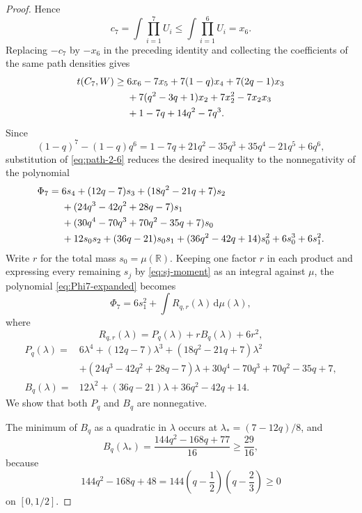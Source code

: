 \documentclass[11pt]{article}
\numberwithin{equation}{section}
\newcommand{\R}{\mathbb R}
\newcommand{\dd}{\,\mathrm d}
\begin{document}
\begin{proof}
  Hence
  \[
    c_7=\int\prod_{i=1}^7U_i
    \le\int\prod_{i=1}^6U_i=x_6.
  \]
  Replacing $-c_7$ by $-x_6$ in the preceding identity and collecting the coefficients of the same path densities gives
  \begin{align}
    t(C_7,W)\ge{}&6x_6-7x_5+7(1-q)x_4+7(2q-1)x_3 \notag\\
    &+7(q^2-3q+1)x_2+7x_2^2-7x_2x_3 \notag\\
    &+1-7q+14q^2-7q^3. \label{eq:C7-IE}
  \end{align}
  Since
  \[
    (1-q)^7-(1-q)q^6
    =1-7q+21q^2-35q^3+35q^4-21q^5+6q^6,
  \]
  substitution of \eqref{eq:path-2-6} reduces the desired inequality to the nonnegativity of the polynomial
  \begin{align}
    \Phi_7={}&6s_4+(12q-7)s_3+(18q^2-21q+7)s_2 \notag\\
    &+(24q^3-42q^2+28q-7)s_1 \notag\\
    &+(30q^4-70q^3+70q^2-35q+7)s_0 \notag\\
    &+12s_0s_2+(36q-21)s_0s_1
    +(36q^2-42q+14)s_0^2+6s_0^3+6s_1^2. \label{eq:Phi7-expanded}
  \end{align}
  Write $r$ for the total mass $s_0=\mu(\R)$.
  Keeping one factor $r$ in each product and expressing every remaining $s_j$ by \eqref{eq:sj-moment} as an integral against $\mu$, the polynomial \eqref{eq:Phi7-expanded} becomes
  \begin{equation}\label{eq:Phi7-integral}
    \Phi_7=6s_1^2+\int R_{q,r}(\lambda)\dd\mu(\lambda),
  \end{equation}
  where
  \[
    R_{q,r}(\lambda)=P_q(\lambda)+rB_q(\lambda)+6r^2,
  \]
  \begin{align*}
    P_q(\lambda)={}&6\lambda^4+(12q-7)\lambda^3
    +(18q^2-21q+7)\lambda^2\\
    &+(24q^3-42q^2+28q-7)\lambda
    +30q^4-70q^3+70q^2-35q+7,\\
    B_q(\lambda)={}&12\lambda^2+(36q-21)\lambda+36q^2-42q+14.
  \end{align*}
  We show that both $P_q$ and $B_q$ are nonnegative.

  The minimum of $B_q$ as a quadratic in $\lambda$ occurs at $\lambda_*=(7-12q)/8$, and
  \[
    B_q(\lambda_*)=\frac{144q^2-168q+77}{16}\ge\frac{29}{16},
  \]
  because
  \[
    144q^2-168q+48=144\left(q-\frac{1}{2}\right)
    \left(q-\frac{2}{3}\right)\ge0
  \]
  on $[0,1/2]$.


\end{proof}
\end{document}
